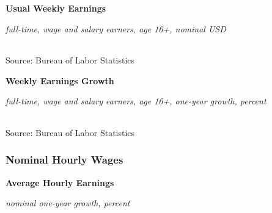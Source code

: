 \documentclass{report}
\makeatletter
\newcommand*\short[1]{\expandafter\@gobbletwo\number\numexpr#1\relax}
\newcommand{\dateaxisticks}{
		date coordinates in=x, axis line style={draw=none},
		xmax={2020-10-01},
		max space between ticks=40,	    
		xtick={{1990-01-01}, {1992-01-01}, {1994-01-01}, 
			{1996-01-01}, {1998-01-01}, {2000-01-01}, 
			{2002-01-01}, {2004-01-01}, {2006-01-01},
			{2008-01-01}, {2010-01-01}, {2012-01-01}, {2014-01-01},
		    {2016-01-01}, {2018-01-01}, {2020-01-01}},
		minor xtick={{1989-01-01}, {1991-01-01}, {1993-01-01},
			{1995-01-01}, {1997-01-01}, {1999-01-01}, 
			{2001-01-01}, {2003-01-01}, {2005-01-01}, {2007-01-01},
		    {2009-01-01}, {2011-01-01}, {2013-01-01}, {2015-01-01},
		    {2017-01-01}, {2019-01-01}},
		enlarge y limits={0.06}, enlarge x limits={0.01},
		}
\newcommand{\bbar}[2]{extra #1 ticks = {{#2}}, extra #1 tick labels = ,
		extra #1 tick style = {grid=major, grid style={thick, black!25}},}
\newcommand{\stdline}[4]{\addplot[very thick, no markers, color=#1] 
		table [x=#2, y=#3, col sep=comma] {#4};	}
\newcommand{\thickline}[4]{\addplot[ultra thick, no markers, color=#1] 
		table [x=#2, y=#3, col sep=comma] {#4};	}
\newcommand{\rbars}{
		\fill[color=black!10] (axis cs:{1990-07-01},\pgfkeysvalueof{/pgfplots/ymin}) rectangle 
			(axis cs:{1991-03-01}, \pgfkeysvalueof{/pgfplots/ymax});
		\fill[color=black!10] (axis cs:{2007-12-01},\pgfkeysvalueof{/pgfplots/ymin}) rectangle 
			(axis cs:{2009-07-01}, \pgfkeysvalueof{/pgfplots/ymax});
		\fill[color=black!10] (axis cs:{2001-03-01},\pgfkeysvalueof{/pgfplots/ymin}) rectangle 
			(axis cs:{2001-11-01}, \pgfkeysvalueof{/pgfplots/ymax});
		\fill[color=black!10] (axis cs:{2020-02-01},\pgfkeysvalueof{/pgfplots/ymin}) rectangle 
			(axis cs:{2020-10-01}, \pgfkeysvalueof{/pgfplots/ymax});}
\makeatother
\begin{document}
{{{{{{{{{\begin{minipage}{0.76\textwidth}
\vspace{7mm}

\normalsize \textbf{Usual Weekly Earnings}

\footnotesize{\textit{full-time, wage and salary earners, age 16+, nominal USD}}

\hspace*{-3mm}  \setlength{\tabcolsep}{3.1pt} \color{black!90}
		{\renewcommand{\arraystretch}{1.55}
		 \begin{tabular}{p{19mm} R{8.8mm} R{8.8mm} R{8.8mm} R{8.8mm} R{8.8mm} R{8.8mm} 
		   R{8.8mm} R{8.8mm} R{8.8mm} R{8.8mm}}
			 \hline
		\end{tabular}}
\vspace{1mm}
		
\footnotesize{Source: Bureau of Labor Statistics}

\vspace{6mm}

\normalsize \textbf{Weekly Earnings Growth}

\footnotesize{\textit{full-time, wage and salary earners, age 16+, one-year growth, percent}}

\hspace*{-3mm}  \setlength{\tabcolsep}{3.1pt} \color{black!90}
		{\renewcommand{\arraystretch}{1.55}
		 \begin{tabular}{p{19mm} R{8.8mm} R{8.8mm} R{8.8mm} R{8.8mm} R{8.8mm} R{8.8mm} 
		   R{8.8mm} R{8.8mm} R{8.8mm} R{8.8mm}}
			 \hline
		\end{tabular}}
\vspace{1mm}
		
\footnotesize{Source: Bureau of Labor Statistics}
\end{minipage}
\newpage
\subsubsection*{\color{black!70} \seriffont Nominal Hourly Wages}
\begin{minipage}{0.76\textwidth}
\small 

\vspace{4mm}

\normalsize \textbf{Average Hourly Earnings}

\footnotesize{\textit{nominal one-year growth, percent}}

\hspace*{-2mm} 


\end{minipage}}}}}}}}}}
\end{document}
